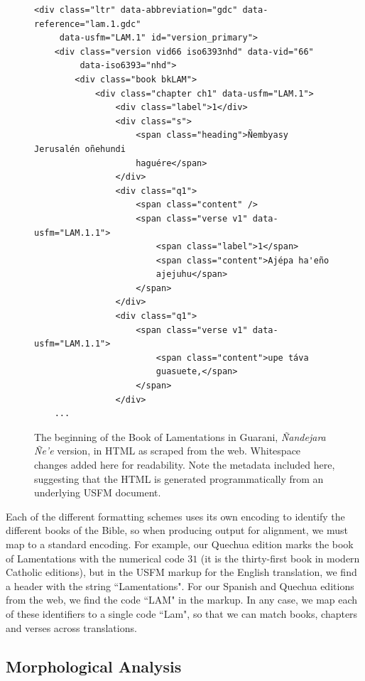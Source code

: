 \begin{figure}
\raggedright \begin{verbatim}
<div class="ltr" data-abbreviation="gdc" data-reference="lam.1.gdc"
     data-usfm="LAM.1" id="version_primary">
    <div class="version vid66 iso6393nhd" data-vid="66"
         data-iso6393="nhd">
        <div class="book bkLAM">
            <div class="chapter ch1" data-usfm="LAM.1">
                <div class="label">1</div>
                <div class="s">
                    <span class="heading">Ñembyasy Jerusalén oñehundi
                    haguére</span>
                </div>
                <div class="q1">
                    <span class="content" />
                    <span class="verse v1" data-usfm="LAM.1.1">
                        <span class="label">1</span>
                        <span class="content">Ajépa ha'eño
                        ajejuhu</span>
                    </span>
                </div>
                <div class="q1">
                    <span class="verse v1" data-usfm="LAM.1.1">
                        <span class="content">upe táva
                        guasuete,</span>
                    </span>
                </div>
    ...
\end{verbatim}
  \caption{The beginning of the Book of Lamentations in Guarani,
  \emph{Ñandejara Ñe'e} version, in HTML as scraped from the web. Whitespace
  changes added here for readability. Note the metadata included here,
  suggesting that the HTML is generated programmatically from an underlying
  USFM document.}
  \label{fig:gn-html-sample}
\end{figure}

Each of the different formatting schemes uses its own encoding to identify the
different books of the Bible, so when producing output for alignment, we must
map to a standard encoding. For example, our Quechua edition marks the book of
Lamentations with the numerical code $31$ (it is the thirty-first book in
modern Catholic editions), but in the USFM markup for the English translation,
we find a header with the string ``Lamentations". For our Spanish and Quechua
editions from the web, we find the code ``LAM" in the markup. In any case, we
map each of these identifiers to a single code ``Lam", so that we can match
books, chapters and verses across translations.

\subsection{Morphological Analysis}
\label{sec:guaranima}

